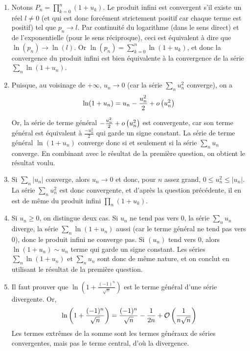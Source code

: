 \begin{enumerate}
    \item Notons $P_n=\prod\limits_{k=0}^n (1+u_k)$. Le produit infini est convergent s'il existe un réel $l\neq 0$ (et qui est donc forcément strictement positif car chaque terme est positif) tel que $p_n\to l$. Par continuité du logarithme (dans le sens direct) et de l'exponentielle (pour le sens réciproque), ceci est équivalent à dire que $\ln(p_n)\to\ln(l)$. Or $\ln(p_n)=\sum\limits_{k=0}^n \ln(1+u_k)$, et donc la convergence du produit infini est bien équivalente à la convergence de la série $\sum_n \ln(1+u_n)$.

    \item Puisque, au voisinage de $+\infty$, $u_n\to 0$ (car la série $\sum\limits_n u_n^2$ converge), on a 
        \[
            \ln(1+u_n)=u_n-\frac{u_n^2}2+o\left(u_n^2\right)
        \]
        
        Or, la série de terme général $-\frac{u_n^2}2+o\left(u_n^2\right)$ est convergente, car son terme général est équivalent à $\frac{-u_n^2}{2}$ qui garde un signe constant. La série de terme général $\ln(1+u_n)$ converge donc si et seulement si la série $\sum\limits_n u_n$ converge. En combinant avec le résultat de la première question, on obtient le résultat voulu.

    \item Si $\sum\limits_n |u_n|$ converge, alors $u_n\to 0$ et donc, pour $n$ assez grand, $0\leqslant u_n^2\leqslant |u_n|$. La série $\sum\limits_n u_n^2$ est donc convergente, et d'après la question précédente, il en est de même du produit infini $\prod\limits_n (1+u_k)$.
    
    \item Si $u_n\geqslant 0$, on distingue deux cas. Si $u_n$ ne tend pas vers 0, la série $\sum_n u_n$ diverge, la série $\sum\limits_n \ln(1+u_n)$ aussi (car le terme général ne tend pas vers 0), donc le produit infini ne converge pas. Si $(u_n)$ tend vers 0, alors $\ln(1+u_n)\sim u_n$ terme qui garde un signe constant. Les séries $\sum\limits_n\ln(1+u_n)$ et $\sum\limits_n u_n$ sont donc de même nature, et on conclut en utilisant le résultat de la première question.

    \item Il faut prouver que $\ln\left(1+\frac{(-1)^n}{\sqrt n}\right)$ est le terme général d'une série divergente. Or, 
        \[
            \ln\left(1+\frac{(-1)^n}{\sqrt n}\right)=\frac{(-1)^n}{\sqrt n}-\frac1{2n}+\mathcal{O}\left(\frac{1}{n\sqrt n}\right)
        \]
        Les termes extrêmes de la somme sont les termes généraux de séries convergentes, mais pas le terme central, d'où la divergence.
\end{enumerate}

